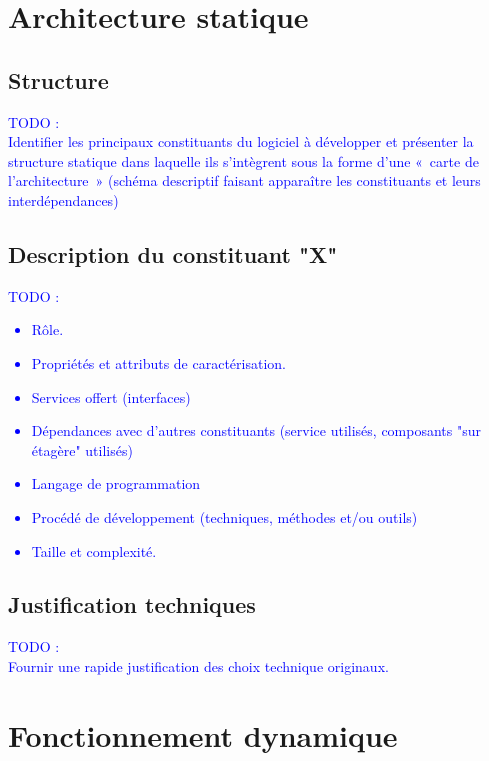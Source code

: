 \documentclass{../res/univ-projet}
\begin{document}
\section{Architecture statique}
  \subsection{Structure} %
    \textcolor{blue}{
      TODO : \\
      Identifier les principaux constituants du logiciel à développer et présenter la structure statique dans laquelle ils s’intègrent sous la forme d’une « carte de l’architecture » (schéma descriptif faisant apparaître les constituants et leurs interdépendances)
    }

  \subsection{Description du constituant "X"} %
    \textcolor{blue}{
      TODO : \\
      {\begin{itemize}
        \item Rôle.
        \item Propriétés et attributs de caractérisation.
        \item Services offert (interfaces)
        \item Dépendances avec d'autres constituants (service utilisés,
        composants "sur étagère" utilisés)
        \item Langage de programmation
        \item Procédé de développement (techniques, méthodes et/ou outils)
        \item Taille et complexité.
      \end{itemize}}
    }
  \subsection{Justification techniques} %
    \textcolor{blue}{
      TODO : \\
      Fournir une rapide justification des choix technique originaux.
    }
\section{Fonctionnement dynamique} %
\label{sec:fonctionnement_dynamique}
\end{document}
